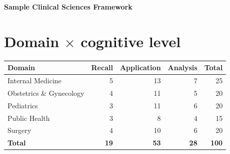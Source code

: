 \documentclass[11pt,a4paper]{article}
\begin{document}
{\color{primary}\LARGE\bfseries Sample Clinical Sciences Framework}\par
{}\par
\vspace{14pt}

\section*{Domain $\times$ cognitive level}
\begin{center}
\begin{tabular}{lrrrr}
\toprule
\textbf{Domain} & \textbf{Recall} & \textbf{Application} & \textbf{Analysis} & \textbf{Total} \\
\midrule
Internal Medicine & 5 & 13 & 7 & 25 \\
Obstetrics \& Gynecology & 4 & 11 & 5 & 20 \\
Pediatrics & 3 & 11 & 6 & 20 \\
Public Health & 3 & 8 & 4 & 15 \\
Surgery & 4 & 10 & 6 & 20 \\
\midrule
\textbf{Total} & \textbf{19} & \textbf{53} & \textbf{28} & \textbf{100} \\
\bottomrule
\end{tabular}
\end{center}
\end{document}
